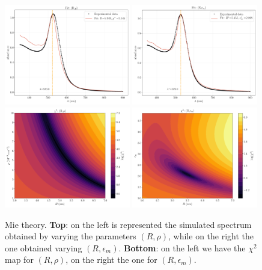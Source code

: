 \documentclass[prb,twocolumn]{revtex4-1}
\begin{document}
\begin{figure}[t!]
    \centering 
    \includegraphics[width=0.49\textwidth]{images/os/1_fit.pdf}
    \hskip 1mm
   \includegraphics[width=0.49\textwidth]{images/os/2_fit.pdf}
    \\
    \includegraphics[width=0.49\textwidth]{images/os/1_chisquare.pdf}
   \hskip 1mm
   \includegraphics[width=0.49\textwidth]{images/os/2_chisquare.pdf}
    \caption{Mie theory. \textbf{Top}: on the left is represented the simulated spectrum obtained by varying the parameters $(R,\rho)$, while on the right the one obtained varying $(R,\epsilon_m)$. \textbf{Bottom}: on the left we have the $\chi^2$ map for $(R,\rho)$, on the right the one for $(R,\epsilon_m)$. }
    \label{fig:optical_results}
\end{figure}
\end{document}
